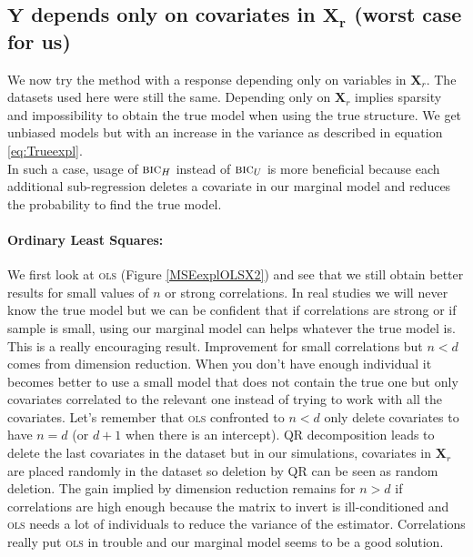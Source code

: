 \documentclass[12pt,a4paper]{report}
\begin{document}
\clearpage
	
	\subsection{$\boldsymbol{Y}$ depends only on covariates in $\boldsymbol{X_r}$ (worst case for us)}	 \label{tableMSEsimgauche}
We now try the method with a response depending only on variables in $\boldsymbol{X}_{r}$. The datasets used here were still the same.
Depending only on $\boldsymbol{X}_r$ implies sparsity and impossibility to obtain the true model when using the true structure.  We get unbiased models but with an increase in the variance as described in equation \ref{eq:Trueexpl}. \\
	In such a case, usage of $\mbox{{\sc bic}}_H$ instead of $\mbox{{\sc bic}}_U$ is more beneficial because each additional sub-regression deletes a covariate in our marginal model and reduces the probability to find the true model. \\
	
	\paragraph{Ordinary Least Squares:}We first look at \textsc{ols} (Figure \ref{MSEexplOLSX2}) and see that we still obtain better results for small values of $n$ or strong correlations. In real studies we will never know the true model but we can be confident that if correlations are strong or if sample is small, using our marginal model can helps whatever the true model is. This is a really encouraging result. Improvement for small correlations but $n<d$ comes from dimension reduction. When you don't have enough individual it becomes better to use a small model that does not contain the true one but only covariates correlated to the relevant one instead of trying to work with all the covariates. Let's remember that \textsc{ols} confronted to $n<d$ only delete covariates to have $n=d$ (or $d+1$ when there is an intercept). QR decomposition leads to delete the last  covariates in the dataset but in our simulations, covariates in $\boldsymbol{X}_r$ are placed randomly in the dataset so deletion by QR can be seen as random deletion. The gain implied by dimension reduction remains for $n>d$ if correlations are high enough because the matrix to invert is ill-conditioned and \textsc{ols} needs a lot of individuals to reduce the variance of the estimator. Correlations really put \textsc{ols} in trouble and our marginal model seems to be a good solution. \\
	
\end{document}
